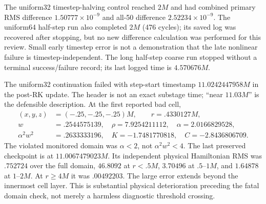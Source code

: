 \documentclass[11pt,letterpaper]{article}
\begin{document}
The uniform32 timestep-halving control reached $2M$ and had combined primary RMS difference $1.50777\times10^{-9}$ and all-50 difference $2.52234\times10^{-9}$. The uniform64 half-step run also completed $2M$ (476 cycles); its saved log was recovered after stopping, but no new difference calculation was performed for this review. Small early timestep error is not a demonstration that the late nonlinear failure is timestep-independent. The long half-step coarse run stopped without a terminal success/failure record; its last logged time is $4.570676M$.

The uniform32 continuation failed with step-start timestamp $11.0242447958M$ in the post-RK update. The header is not an exact substage time; ``near $11.03M$'' is the defensible description. At the first reported bad cell,
\begin{align}
(x,y,z)&=(-.25,-.25,-.25)M,\qquad r=.4330127M,\\
w&=.2544575139,\quad\rho=7.9254211112,\quad\alpha=2.0166829528,\\
\alpha^2w^2&=.2633333196,\quad K=-1.7481770818,\quad C=-2.8436806709.
\end{align}
The violated monitored domain was $\alpha<2$, not $\alpha^2w^2<4$. The last preserved checkpoint is at $11.0067479023M$. Its independent physical Hamiltonian RMS was $.752724$ over the full domain, $46.8092$ at $r<.5M$, $3.70496$ at $.5$--$1M$, and $1.64878$ at $1$--$2M$. At $r\ge4M$ it was $.00492203$. The large error extends beyond the innermost cell layer. This is substantial physical deterioration preceding the fatal domain check, not merely a harmless diagnostic threshold crossing.
\end{document}
